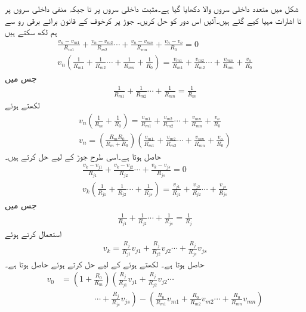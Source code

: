 شکل  میں متعدد داخلی سروں  والا  دکھایا گیا ہے۔مثبت داخلی سروں  پر  تا  جبکہ منفی داخلی سروں  پر  تا  اشارات مہیا کیے گئے ہیں۔آئیں اس دور کو حل کریں۔
جوڑ  پر کرخوف کے قانون برائے برقی رو سے ہم لکھ سکتے ہیں
\begin{align*}
\frac{v_n-v_{m1}}{R_{m1}}+\frac{v_n-v_{m2}}{R_{m2}} \cdots +\frac{v_n-v_{mn}}{R_{mn}}+\frac{v_n-v_o}{R_0}=0\\
v_n \left(\frac{1}{R_{m1}}+\frac{1}{R_{m2}}\cdots +\frac{1}{R_{mn}}+\frac{1}{R_0} \right)=\frac{v_{m1}}{R_{m1}}+\frac{v_{m2}}{R_{m2}}\cdots +\frac{v_{mn}}{R_{mn}}+\frac{v_o}{R_0}
\end{align*}
جس میں
\begin{align*}
\frac{1}{R_{m1}}+\frac{1}{R_{m2}}\cdots +\frac{1}{R_{mn}}=\frac{1}{R_m}
\end{align*}
لکھتے ہوئے
\begin{align*}
v_n \left(\frac{1}{R_m}+\frac{1}{R_0} \right)=\frac{v_{m1}}{R_{m1}}+\frac{v_{m2}}{R_{m2}}\cdots +\frac{v_{mn}}{R_{mn}}+\frac{v_o}{R_0}\\
v_n=\left(\frac{R_mR_0}{R_m+R_0} \right)\left(\frac{v_{m1}}{R_{m1}}+\frac{v_{m2}}{R_{m2}}\cdots +\frac{v_{mn}}{R_{mn}}+\frac{v_o}{R_0} \right)
\end{align*}
حاصل ہوتا ہے۔اسی طرح جوڑ  کے لیے حل کرتے ہیں۔
\begin{align*}
\frac{v_k-v_{j1}}{R_{j1}}+\frac{v_k-v_{j2}}{R_{j2}}\cdots +\frac{v_k-v_{js}}{R_{js}}=0\\
v_k \left(\frac{1}{R_{j1}}+ \frac{1}{R_{j2}}\cdots + \frac{1}{R_{js}}\right)=\frac{v_{j1}}{R_{j1}}+\frac{v_{j2}}{R_{j2}}\cdots+\frac{v_{js}}{R_{js}}
\end{align*}
جس میں
\begin{align*}
\frac{1}{R_{j1}}+ \frac{1}{R_{j2}}\cdots + \frac{1}{R_{js}}=\frac{1}{R_{j}}
\end{align*}
استعمال کرتے ہوئے 
\begin{align*}
v_k=\frac{R_j }{R_{j1}}v_{j1}+\frac{R_j }{R_{j2}}v_{j2}\cdots+\frac{R_j }{R_{js}}v_{js}
\end{align*}
حاصل ہوتا ہے۔ لکھتے ہوئے  کے لیے حل کرتے ہوئے حاصل ہوتا ہے۔
\begin{align} \label{مساوات_حسابی_جمع_و_منفی_کار}
v_0&=\left( 1+\frac{R_0}{R_m}\right)\left(\frac{R_j }{R_{j1}}v_{j1}+\frac{R_j }{R_{j2}}v_{j2}\cdots \right. \\
& \qquad  \qquad \left. \cdots +\frac{R_j }{R_{js}}v_{js} \right)-\left(\frac{R_0}{R_{m1}}v_{m1}+\frac{R_0}{R_{m2}}v_{m2}\cdots +\frac{R_0}{R_{mn}}v_{mn}\right)
\end{align}

